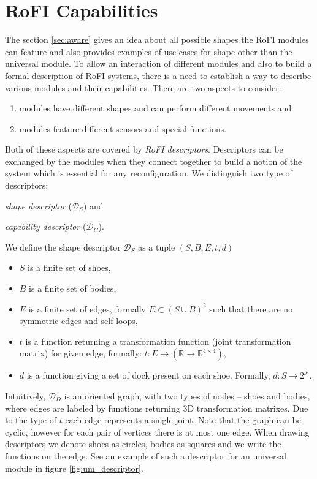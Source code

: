 \section{RoFI Capabilities}\label{sec:capabilities}

The section \ref{sec:aware} gives an idea about all possible shapes the RoFI
modules can feature and also provides examples of use cases for shape other than
the universal module. To allow an interaction of different modules and also to
build a formal description of RoFI systems, there is a need to establish a way
to describe various modules and their capabilities. There are two aspects to
consider:
\begin{enumerate}
    \item modules have different shapes and can perform different movements and
    \item modules feature different sensors and special functions.
\end{enumerate}

Both of these aspects are covered by \emph{RoFI descriptors}. Descriptors can be
exchanged by the modules when they connect together to build a notion of the
system which is essential for any reconfiguration. We distinguish two type of
descriptors:
\begin{enumerate*}
    \item \emph{shape descriptor} ($\mathcal{D}_S$) and
    \item \emph{capability descriptor} ($\mathcal{D}_C$).
\end{enumerate*}

We define the shape descriptor $\mathcal{D}_S$ as a tuple $(S, B, E, t, d)$
\begin{itemize}
    \item $S$ is a finite set of shoes,
    \item $B$ is a finite set of bodies,
    \item $E$ is a finite set of edges, formally $E \subset (S\cup B)^2$ such
    that there are no symmetric edges and self-loops,
    \item $t$ is a function returning a transformation function (joint
    transformation matrix) for given edge, formally: $t:
    E\rightarrow(\mathds{R}\rightarrow\mathds{R}^{4\times4})$,
    \item $d$ is a function giving a set of dock present on each shoe. Formally,
    $d: S\rightarrow 2^\mathcal{P}$.
\end{itemize}
Intuitively, $\mathcal{D}_D$ is an oriented graph, with two types of nodes --
shoes and bodies, where edges are labeled by functions returning 3D
transformation matrixes. Due to the type of $t$ each edge represents a single
joint. Note that the graph can be cyclic, however for each pair of vertices
there is at most one edge. When drawing descriptors we denote shoes as circles,
bodies as squares and we write the functions on the edge. See an example of such
a descriptor for an universal module in figure \ref{fig:um_descriptor}.

